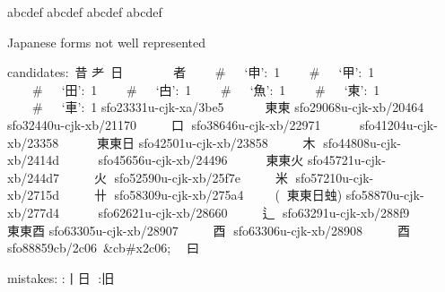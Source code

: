 

abc{\mktsFontfileSunexta\color{red}}def
abc{\mktsFontfileSunexta\color{red}}def
abc{\color{red}}def
abcdef





\vspace{\mktsLineheight}\begin{multicols}{2}\raggedcolumns{}



Japanese forms not well represented

\begingroup\mktsObeyAllLines{}
candidates: {\cjk{}昔
耂} {\cjk{}日}        {\cjk{}者}
    \#   ‘{\cjk{}申}’: 1
    \#   ‘{\cjk{}甲}’: 1
    \#   ‘{\cjk{}田}’: 1
    \#   ‘{\cjk{}甴}’: 1
    \#   ‘{\cjk{}魚}’: 1
    \#   ‘{\cjk{}東}’: 1
    \#   ‘{\cjk{}車}’: 1
{}
sfo23331u-cjk-xa/3be5   {}   {\cnxJzr{}}{\cjk{}東東}
sfo29068u-cjk-xb/20464  {}   {\cnxJzr{}}{}
sfo32440u-cjk-xb/21170  {}   {\cnxJzr{}}{\cjk{}口{\cnxb{}𣍘}}
sfo38646u-cjk-xb/22971  {}   {\cnxJzr{}}{}
sfo41204u-cjk-xb/23358  {}   {\cnxJzr{}}{\cnxJzr{}}{\cjk{}東東日}
sfo42501u-cjk-xb/23858  {}   {\cnxJzr{}}{\cjk{}木{\cnxb{}𣍘}}
sfo44808u-cjk-xb/2414d  {}   {\cnxJzr{}}{}
sfo45656u-cjk-xb/24496  {}   {\cnxJzr{}}{\cnxJzr{}}{\cjk{}東東火}
sfo45721u-cjk-xb/244d7  {}   {\cnxJzr{}}{\cjk{}火{\cnxb{}𣍘}}
sfo52590u-cjk-xb/25f7e  {}   {\cnxJzr{}}{\cjk{}米{\cnxb{}𣍘}}
sfo57210u-cjk-xb/2715d  {}   {\cnxJzr{}}{\cjk{}卄{\cnxb{}𣍘}}
sfo58309u-cjk-xb/275a4  {}   ({\cnxJzr{}}{\cnxJzr{}}{\cjk{}東東日{\cnxa{}䖵}})
sfo58870u-cjk-xb/277d4  {}   {\cnxJzr{}}{}
sfo62621u-cjk-xb/28660  {}   {\cnxJzr{}}{\cjk{}辶{\cnxb{}𣍘}}
sfo63291u-cjk-xb/288f9  {}   {\cnxJzr{}}{\cnxJzr{}}{\cjk{}東東酉}
sfo63305u-cjk-xb/28907  {}   {\cnxJzr{}}{\cjk{}酉{\cnxb{}𣍘}}
sfo63306u-cjk-xb/28908  {}   {\cnxJzr{}}{酉}
sfo88859cb/2c06 \&cb\#x2c06;  {\cnxJzr{}}{曰}

mistakes:
{}:{丨日
{\cnxb{}𨺻}}:{旧}


\end{multicols}
